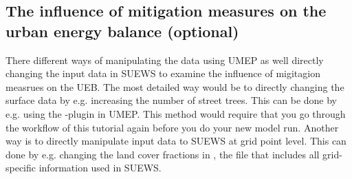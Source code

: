 \documentclass[letterpaper,10pt,english]{sphinxmanual}
\begin{document}
\subsection{The influence of mitigation measures on the urban energy balance (optional)}
\label{\detokenize{Tutorials/SuewsSpatial:the-influence-of-mitigation-measures-on-the-urban-energy-balance-optional}}
There different ways of manipulating the data using UMEP as well directly changing the input data in SUEWS to examine the influence of migitagion measrues on the UEB. The most detailed way would be to directly changing the surface data by e.g. increasing the number of street trees. This can be done by e.g. using the {\hyperref[\detokenize{pre-processor/Spatial Data Tree Generator:treegenerator}]{}}-plugin in UMEP. This method would require that you go through the workflow of this tutorial again before you do your new model run. Another way is to directly manipulate input data to SUEWS at grid point level. This can done by e.g. changing the land cover fractions in , the file that includes all grid-specific information used in SUEWS.
\end{document}
